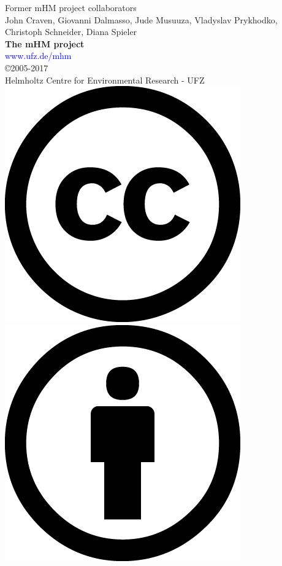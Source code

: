 \documentclass[twoside]{book}
\newcommand{\+}{\discretionary{\mbox{\scriptsize$\hookleftarrow$}}{}{}}
\begin{document}
\newpage

\vspace*{2cm}
\begin{center}%
{\large Former mHM project collaborators}\\
\vspace*{0.5cm}
{\large 
John Craven,
Giovanni Dalmasso,
Jude Musuuza,
Vladyslav Prykhodko,
Christoph Schneider,
Diana Spieler
}\\
\vspace*{15.5cm}
{\huge \textbf{The mHM project}}\\
\textcolor{blue}{www.ufz.de/mhm}\\
\vspace*{0.5cm}
{\large \copyright 2005-2017}\\
{\large Helmholtz Centre for Environmental Research - UFZ}\\
\vspace*{0.2cm}
\includegraphics[totalheight=5.mm]{figures/cc_large.png}\,%
\includegraphics[totalheight=5.mm]{figures/by_large.png}\,%

\end{center}
\end{document}
